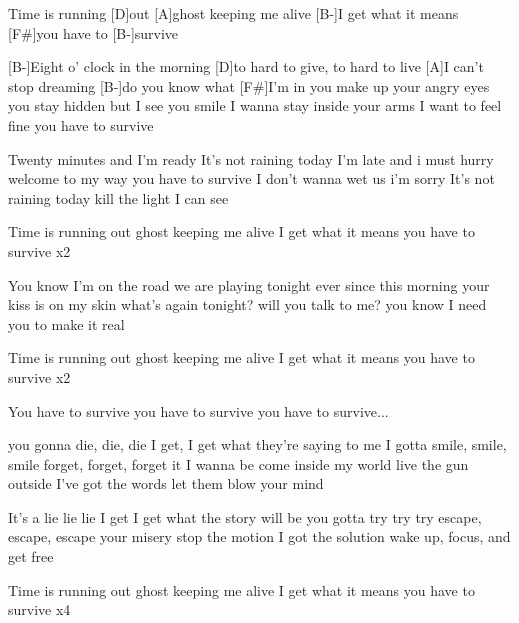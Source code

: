 
\begin{guitar}
[B-]Time is running [D]out
[A]ghost keeping me alive
[B-]I get what it means
[F#]you have to [B-]survive


[B-]Eight o' clock in the morning
[D]to hard to give, to hard to live
[A]I can't stop dreaming
[B-]do you know what [F#]I'm in
you make up your angry eyes
you stay hidden but I see you smile
I wanna stay inside your arms
I want to feel fine
you have to survive

Twenty minutes and I'm ready
It's not raining today
I'm late and i must hurry
welcome to my way
you have to survive
I don't wanna wet us i'm sorry
It's not raining today
kill the light
I can see

Time is running out
ghost keeping me alive
I get what it means
you have to survive x2

You know I'm on the road
we are playing tonight
ever since this morning
your kiss is on my skin
what's again tonight?
will you talk to me?
you know I need you
to make it real

Time is running out
ghost keeping me alive
I get what it means
you have to survive x2


You have to survive
you have to survive
you have to survive...

you gonna die, die, die
I get, I get what they're saying to me
I gotta smile, smile, smile
forget, forget, forget it I wanna be
come inside my world
live the gun outside
I've got the words
let them blow your mind

It's a lie lie lie
I get I get what the story will be
you gotta try try try
escape, escape, escape your misery
stop the motion
I got the solution
wake up, focus, and get free

Time is running out
ghost keeping me alive
I get what it means
you have to survive x4
\end{guitar}